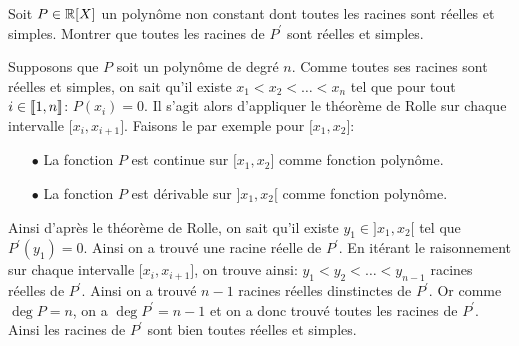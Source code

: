 \documentclass[a4paper, 11pt,reqno]{article}
\begin{document}
\begin{exercice}  \;
	\noindent Soit $P\in\mathbb{R}\lbrack X\rbrack$ un polyn\^ome non constant dont toutes les racines sont r\'eelles et simples. Montrer que toutes les racines de $P^{\prime}$ sont r\'eelles et simples.
\end{exercice}
\begin{correction}  \;
	Supposons que $P$ soit un polyn\^{o}me de degr\'e $n$. Comme toutes ses racines sont r\'eelles et simples, on sait qu'il existe $x_1<x_2<\dots<x_n$ tel que pour tout $i\in\llbracket  1,n\rrbracket$: $P(x_i)=0$. Il s'agit alors d'appliquer le th\'eor\`{e}me de Rolle sur chaque intervalle $\lbrack x_i, x_{i+1}\rbrack$. Faisons le par exemple pour $\lbrack x_1,x_2\rbrack$:
	\begin{itemize}
		\item[$\bullet$] La fonction $P$ est continue sur $\lbrack x_1,x_2\rbrack$ comme fonction polyn\^{o}me.
		\item[$\bullet$] La fonction $P$ est d\'erivable sur $\rbrack x_1,x_2\lbrack$ comme fonction polyn\^{o}me.
	\end{itemize}
	Ainsi d'apr\`{e}s le th\'eor\`{e}me de Rolle, on sait qu'il existe $y_1\in\rbrack x_1,x_2\lbrack$ tel que $P^{\prime}(y_1)=0$. Ainsi on a trouv\'e une racine r\'eelle de $P^{\prime}$. En it\'erant le raisonnement sur chaque intervalle $\lbrack x_i,x_{i+1}\rbrack$, on trouve ainsi: $y_1<y_2<\dots <y_{n-1}$ racines r\'eelles de $P^{\prime}$. Ainsi on a trouv\'e $n-1$ racines r\'eelles dinstinctes de $P^{\prime}$. Or comme $\deg{P}=n$, on a $\deg{P^{\prime}}=n-1$ et on a donc trouv\'e toutes les racines de $P^{\prime}$. Ainsi les racines de $P^{\prime}$ sont bien toutes r\'eelles et simples.
\end{correction}
\end{document}
